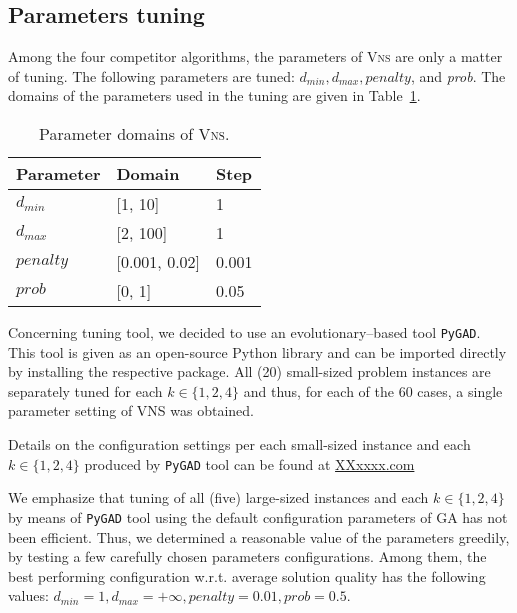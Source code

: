 \documentclass[dvipsnames,format=sigconf,anonymous=true,review=true]{acmart}
\begin{document}
\subsection{Parameters tuning}
   Among the four competitor algorithms, the parameters of \textsc{Vns} are only a matter of tuning. The following parameters are tuned: $d_{min}, d_{max}, penalty$, and \emph{prob}.  The domains of the parameters used in the tuning are given in Table~\ref{tab:domain_tuning}.
   
    \begin{table}[ht]
    	\caption{Parameter domains of \textsc{Vns}.}  
    	\label{tab:domain_tuning}
   	\begin{tabular}{lll}
    Parameter       & Domain & Step \\ \hline
   	$d_{min}$  &  [1, 10] & 1 \\
   	$d_{max}$  & [2, 100] & 1\\
   	 $penalty$ & [0.001, 0.02]  & 0.001 \\
   	 $prob$    & [0, 1] & 0.05 \\ \hline
   	\end{tabular}
   \end{table}
   
   Concerning tuning tool, we decided to use an evolutionary--based tool \texttt{PyGAD}. This tool is given as an open-source Python library and can be imported directly by installing the respective package. All (20) small-sized problem instances are separately tuned for each $k\in \{1, 2, 4\}$ and thus, for each of the 60 cases, a single parameter setting of VNS was obtained. 
  
    
     Details on the configuration settings per each small-sized instance and each $k\in \{1, 2, 4\}$ produced by \texttt{PyGAD} tool can be found at \url{XXxxxx.com}
     
     We emphasize that tuning of all (five) large-sized instances and each $k \in \{1,2,4\}$  by means of \texttt{PyGAD} tool using the default configuration parameters of GA has not been efficient. Thus, we determined a reasonable  value of the parameters  greedily, by testing a few carefully chosen parameters configurations. Among them, the best performing configuration w.r.t. average solution quality has the following values: $d_{min}=1, d_{max} = + \infty, penalty = 0.01, prob=0.5$. 
\end{document}
